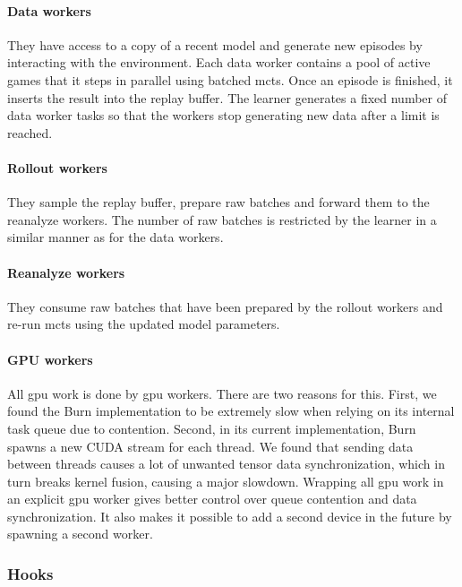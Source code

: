 \paragraph{Data workers}
They have access to a copy of a recent model and generate new episodes by interacting with the environment.
Each data worker contains a pool of active games that it steps in parallel using batched \gls{mcts}.
Once an episode is finished, it inserts the result into the replay buffer.
The learner generates a fixed number of data worker tasks so that the workers stop generating
new data after a limit is reached.

\paragraph{Rollout workers}
They sample the replay buffer, prepare raw batches and forward them to the reanalyze workers.
The number of raw batches is restricted by the learner in a similar manner as for the data workers.

\paragraph{Reanalyze workers}
They consume raw batches that have been prepared by the rollout workers and re-run \gls{mcts}
using the updated model parameters.

\paragraph{GPU workers}
All \gls{gpu} work is done by \gls{gpu} workers.
There are two reasons for this.
First, we found the Burn implementation to be extremely slow when relying on its internal
task queue due to contention.
Second, in its current implementation, Burn spawns a new CUDA stream for each thread.
We found that sending data between threads causes a lot of unwanted tensor data synchronization,
which in turn breaks kernel fusion, causing a major slowdown.
Wrapping all \gls{gpu} work in an explicit \gls{gpu} worker gives better control over queue
contention and data synchronization.
It also makes it possible to add a second device in the future by spawning a second worker.



\subsubsection{Hooks}\label{hooks}

